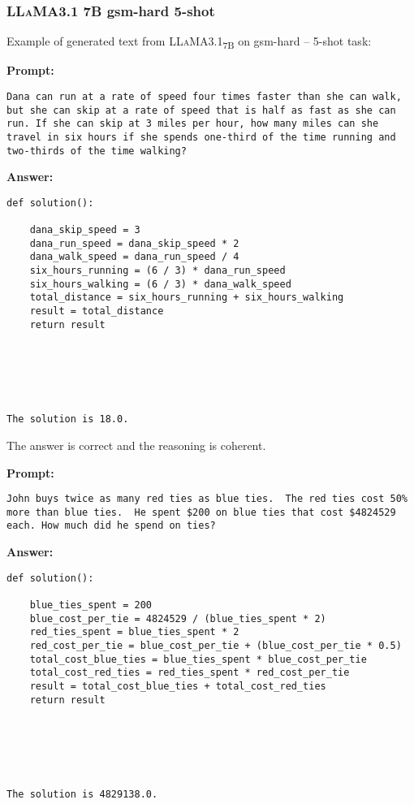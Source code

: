 	\subsubsection*{\textsc{LLaMA}3.1 7B gsm-hard 5-shot}
	\noindent Example of generated text from \textsc{LLaMA}3.1\textsubscript{7B} on gsm-hard -- 5-shot task:
	\begin{displayquote}
		\textbf{Prompt:}
		\begin{Verbatim}[fontsize=\small,breaklines]
Dana can run at a rate of speed four times faster than she can walk, but she can skip at a rate of speed that is half as fast as she can run. If she can skip at 3 miles per hour, how many miles can she travel in six hours if she spends one-third of the time running and two-thirds of the time walking?
	\end{Verbatim}
		\textbf{Answer:}
		\begin{Verbatim}[fontsize=\small,breaklines]
def solution():

    dana_skip_speed = 3
    dana_run_speed = dana_skip_speed * 2
    dana_walk_speed = dana_run_speed / 4
    six_hours_running = (6 / 3) * dana_run_speed
    six_hours_walking = (6 / 3) * dana_walk_speed
    total_distance = six_hours_running + six_hours_walking
    result = total_distance
    return result






The solution is 18.0.
	\end{Verbatim}
	\end{displayquote}
	The answer is correct and the reasoning is coherent.
	\begin{displayquote}
		\textbf{Prompt:}
		\begin{Verbatim}[fontsize=\small,breaklines]
John buys twice as many red ties as blue ties.  The red ties cost 50% more than blue ties.  He spent $200 on blue ties that cost $4824529 each. How much did he spend on ties?
	\end{Verbatim}
		\textbf{Answer:}
		\begin{Verbatim}[fontsize=\small,breaklines]
def solution():

    blue_ties_spent = 200
    blue_cost_per_tie = 4824529 / (blue_ties_spent * 2)
    red_ties_spent = blue_ties_spent * 2
    red_cost_per_tie = blue_cost_per_tie + (blue_cost_per_tie * 0.5)
    total_cost_blue_ties = blue_ties_spent * blue_cost_per_tie
    total_cost_red_ties = red_ties_spent * red_cost_per_tie
    result = total_cost_blue_ties + total_cost_red_ties
    return result






The solution is 4829138.0.
	\end{Verbatim}
	\end{displayquote}
